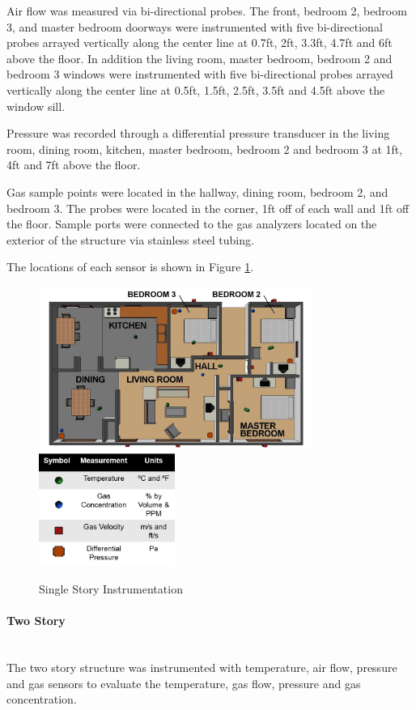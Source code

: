 \documentclass{article}
\begin{document}
Air flow was measured via bi-directional probes. The front, bedroom 2, bedroom 3, and master bedroom doorways were instrumented with five bi-directional probes arrayed vertically along the center line at 0.7ft, 2ft, 3.3ft, 4.7ft and 6ft above the floor. In addition the living room, master bedroom, bedroom 2 and bedroom 3 windows were instrumented with five bi-directional probes arrayed vertically along the center line at 0.5ft, 1.5ft, 2.5ft, 3.5ft and 4.5ft above the window sill. 

Pressure was recorded through a differential pressure transducer in the living room, dining room, kitchen, master bedroom, bedroom 2 and bedroom 3 at 1ft, 4ft and 7ft above the floor. 

Gas sample points were located in the hallway, dining room, bedroom 2, and bedroom 3. The probes were located in the corner, 1ft off of each wall and 1ft off the floor. Sample ports were connected to the gas analyzers located on the exterior of the structure via stainless steel tubing. 

The locations of each sensor is shown in Figure \ref{fig:SingleStoryInst}.

\begin{figure}[H]
	\centering
	\includegraphics[width = 3.5in]{0_Images/Instrumentation/Single_Story_Instrumentation.png}
	\includegraphics[width = 1.75in]{0_Images/Instrumentation/Single_Story_Instrumentation_Key2.png}
	\caption{Single Story Instrumentation}
	\label{fig:SingleStoryInst}
\end{figure}

\paragraph{Two Story} \mbox{}\\
The two story structure was instrumented with temperature, air flow, pressure and gas sensors to evaluate the temperature, gas flow, pressure and gas concentration. 
\end{document}
